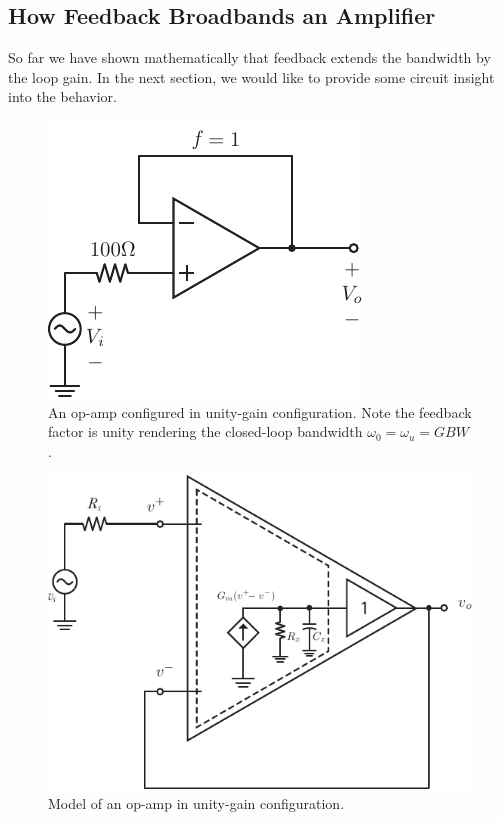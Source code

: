 \subsection{How Feedback Broadbands an Amplifier}
So far we have shown mathematically that feedback extends the bandwidth by the loop gain. In the next section, we would like to provide some circuit insight into the behavior.
\vspace{2cm}
\begin{figure}[H]
\centering
\includegraphics[scale=1.35]{opamp_unitygain}
\caption{An op-amp configured in unity-gain configuration.  Note the feedback factor is unity rendering the closed-loop bandwidth $\omega_0 = \omega_u = GBW$.}
\label{fig:opamp_unitygain}
\end{figure}
\newpage
\begin{figure}[tb]
\centering
\includegraphics[scale=1.25]{opamp_model_fb_unity}
\caption{Model of an op-amp in unity-gain configuration.}
\label{fig:opamp_model_fb_unity}
\end{figure}
